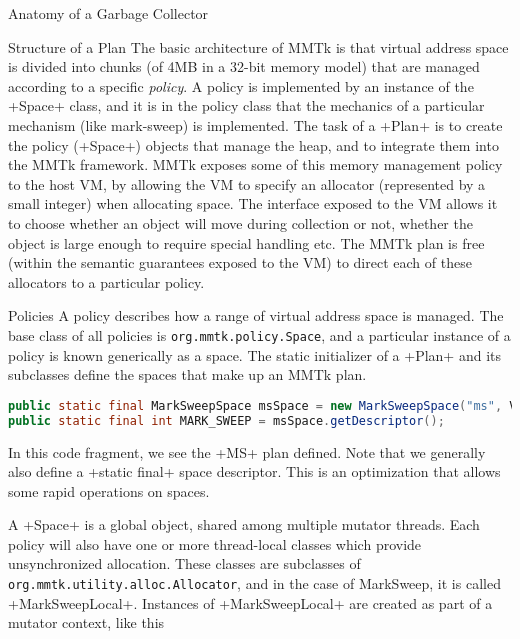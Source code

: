 \begin{section}{Anatomy of a Garbage Collector}
\begin{subsection}{Structure of a Plan}
The basic architecture of MMTk is that virtual address space is divided into chunks (of 4MB in a 32-bit memory model) that are managed according to a specific \textit{policy}. A policy is implemented by an instance of the \spverb+Space+ class, and it is in the policy class that the mechanics of a particular mechanism (like mark-sweep) is implemented. The task of a \spverb+Plan+ is to create the policy (\spverb+Space+) objects that manage the heap, and to integrate them into the MMTk framework.  
MMTk exposes some of this memory management policy to the host VM, by allowing the VM to specify an allocator (represented by a small integer) when allocating space.  The interface exposed to the VM allows it to choose whether an object will move during collection or not, whether the object is large enough to require special handling etc. The MMTk plan is free (within the semantic guarantees exposed to the VM) to direct each of these allocators to a particular policy.

\end{subsection}

\begin{subsection}{Policies}
A policy describes how a range of virtual address space is managed.  The base class of all policies is \texttt{org.mmtk.policy.Space}, and a particular instance of a policy is known generically as a space.  The static initializer of a \spverb+Plan+ and its subclasses define the spaces that make up an MMTk plan.  

\begin{lstlisting}[language=Java,title=MS.java]
public static final MarkSweepSpace msSpace = new MarkSweepSpace("ms", VMRequest.discontiguous());
public static final int MARK_SWEEP = msSpace.getDescriptor();
\end{lstlisting}

In this code fragment, we see the \spverb+MS+ plan defined.  Note that we generally also define a \spverb+static final+ space descriptor.  This is an optimization that allows some rapid operations on spaces.

A \spverb+Space+ is a global object, shared among multiple mutator threads.  Each policy will also have one or more thread-local classes which provide unsynchronized allocation.  These classes are subclasses of \texttt{org.mmtk.u\-ti\-li\-ty.al\-loc.Al\-loc\-a\-tor}, and in the case of MarkSweep, it is called \spverb+MarkSweepLocal+.  Instances of \spverb+MarkSweepLocal+ are created as part of a mutator context, like this


\end{subsection}
\end{section}
